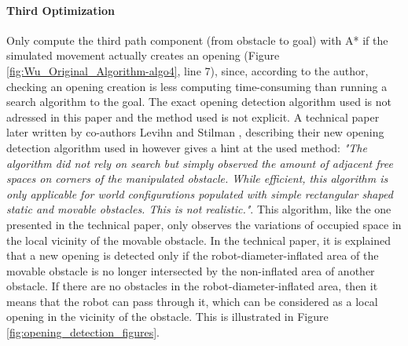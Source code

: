 \paragraph{Third Optimization}\label{optimization_3} Only compute the third path component (from obstacle to goal) with A* if the simulated movement actually creates an opening (Figure \ref{fig:Wu_Original_Algorithm-algo4}, line 7), since, according to the author, checking an opening creation is less computing time-consuming than running a search algorithm to the goal. The exact opening detection algorithm used is not adressed in this paper and the method used is not explicit. A technical paper later written by co-authors Levihn and Stilman \parencite{levihn_efficient_2011}, describing their new opening detection algorithm used in \parencite{levihn_locally_2014} however gives a hint at the used method: \textit{"The algorithm did not rely on search but simply observed the amount of adjacent free spaces on corners of the manipulated obstacle. While efficient, this algorithm is only applicable for world configurations populated with simple rectangular shaped static and movable obstacles. This is not realistic."}. This algorithm, like the one presented in the technical paper, only observes the variations of occupied space in the local vicinity of the movable obstacle. In the technical paper, it is explained that a new opening is detected only if the robot-diameter-inflated area of the movable obstacle is no longer intersected by the non-inflated area of another obstacle. If there are no obstacles in the robot-diameter-inflated area, then it means that the robot can pass through it, which can be considered as a local opening in the vicinity of the obstacle. This is illustrated in Figure \ref{fig:opening_detection_figures}.

\clearpage

